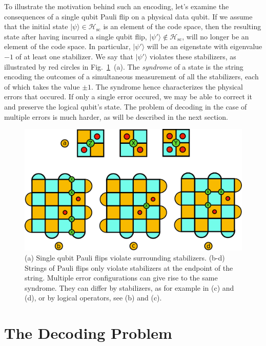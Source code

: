 \documentclass[twocolumn,preprintnumbers,amsmath,amssymb,notitlepage,nofootinbib,longbibliography,superscriptaddress,aps,pra,10pt]{revtex4-1}
\begin{document}
	To illustrate the motivation behind such an encoding, let's examine the consequences of a single qubit Pauli flip on a physical data qubit.
	If we assume that the initial state $|\psi\rangle \in \mathcal{H}_\mathrm{sc}$ is an element of the code space, then the resulting state
	after having incurred a single qubit flip, $|\psi'\rangle \not \in \mathcal{H}_\mathrm{sc}$, will no longer be an element of the code space.
	In particular, $|\psi'\rangle$ will be an eigenstate with eigenvalue $-1$ of at least one stabilizer.
	We say that $|\psi'\rangle$ violates these stabilizers, as illustrated by red circles in Fig.~\ref{f:surface_code_examples}~(a).
	The \textit{syndrome} of a state is the string encoding the outcomes of a simultaneous measurement of all the stabilizers,
	each of which takes the value $\pm 1$. The syndrome hence characterizes the physical errors that occured. If only a single error occured,
	we may be able to correct it and preserve the logical qubit's state. The problem of decoding in the case of multiple errors is
	much harder, as will be described in the next section.

	\begin{figure}
		\centering
		\includegraphics[width=1\linewidth]{figures/surface_code_examples.pdf}
		\caption{
			(a) Single qubit Pauli flips violate surrounding stabilizers.
			(b-d) Strings of Pauli flips only violate stabilizers at the endpoint of the string.
			Multiple error configurations can give rise to the same syndrome.
			They can differ by stabilizers, as for example in (c) and (d), or by logical operators, see (b) and (c).
		}
		\label{f:surface_code_examples}
	\end{figure}

\section{The Decoding Problem}\label{s:the_decoding_problem}
\end{document}
